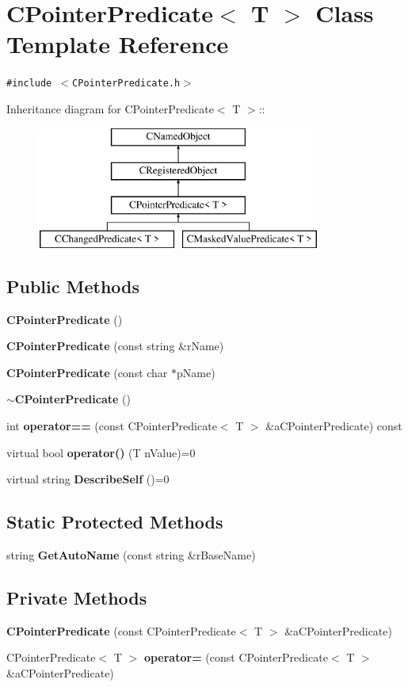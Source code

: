 \section{CPointer\-Predicate$<$ T $>$  Class Template Reference}
\label{classCPointerPredicate}
{\tt \#include $<$CPointer\-Predicate.h$>$}

Inheritance diagram for CPointer\-Predicate$<$ T $>$::\begin{figure}[H]
\begin{center}
\leavevmode
\includegraphics[height=4cm]{classCPointerPredicate}
\end{center}
\end{figure}
\subsection*{Public Methods}
\begin{CompactItemize}
\item 
{\bf CPointer\-Predicate} ()
\item 
{\bf CPointer\-Predicate} (const string \&r\-Name)
\item 
{\bf CPointer\-Predicate} (const char $\ast$p\-Name)
\item 
{\bf $\sim$CPointer\-Predicate} ()
\item 
int {\bf operator==} (const CPointer\-Predicate$<$ T $>$ \&a\-CPointer\-Predicate) const
\item 
virtual bool {\bf operator()} (T n\-Value)=0
\item 
virtual string {\bf Describe\-Self} ()=0
\end{CompactItemize}
\subsection*{Static Protected Methods}
\begin{CompactItemize}
\item 
string {\bf Get\-Auto\-Name} (const string \&r\-Base\-Name)
\end{CompactItemize}
\subsection*{Private Methods}
\begin{CompactItemize}
\item 
{\bf CPointer\-Predicate} (const CPointer\-Predicate$<$ T $>$ \&a\-CPointer\-Predicate)
\item 
CPointer\-Predicate$<$ T $>$ {\bf operator=} (const CPointer\-Predicate$<$ T $>$ \&a\-CPointer\-Predicate)
\end{CompactItemize}
